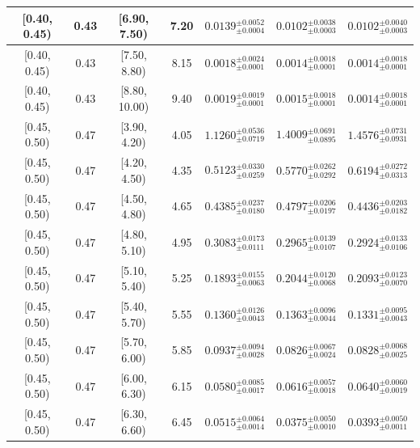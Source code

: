\begin{longtable}{|c|c|c|c|c|c|c|}
\hline
[0.40, 0.45) & 0.43 & [6.90, 7.50) & 7.20 & $0.0139^{ \pm 0.0052 }_{ \pm 0.0004 }$ & $0.0102^{ \pm 0.0038 }_{ \pm 0.0003 }$ & $0.0102^{ \pm 0.0040 }_{ \pm 0.0003 }$ \\ 
\hline
[0.40, 0.45) & 0.43 & [7.50, 8.80) & 8.15 & $0.0018^{ \pm 0.0024 }_{ \pm 0.0001 }$ & $0.0014^{ \pm 0.0018 }_{ \pm 0.0001 }$ & $0.0014^{ \pm 0.0018 }_{ \pm 0.0001 }$ \\ 
\hline
[0.40, 0.45) & 0.43 & [8.80, 10.00) & 9.40 & $0.0019^{ \pm 0.0019 }_{ \pm 0.0001 }$ & $0.0015^{ \pm 0.0018 }_{ \pm 0.0001 }$ & $0.0014^{ \pm 0.0018 }_{ \pm 0.0001 }$ \\ 
\hline
[0.45, 0.50) & 0.47 & [3.90, 4.20) & 4.05 & $1.1260^{ \pm 0.0536 }_{ \pm 0.0719 }$ & $1.4009^{ \pm 0.0691 }_{ \pm 0.0895 }$ & $1.4576^{ \pm 0.0731 }_{ \pm 0.0931 }$ \\ 
\hline
[0.45, 0.50) & 0.47 & [4.20, 4.50) & 4.35 & $0.5123^{ \pm 0.0330 }_{ \pm 0.0259 }$ & $0.5770^{ \pm 0.0262 }_{ \pm 0.0292 }$ & $0.6194^{ \pm 0.0272 }_{ \pm 0.0313 }$ \\ 
\hline
[0.45, 0.50) & 0.47 & [4.50, 4.80) & 4.65 & $0.4385^{ \pm 0.0237 }_{ \pm 0.0180 }$ & $0.4797^{ \pm 0.0206 }_{ \pm 0.0197 }$ & $0.4436^{ \pm 0.0203 }_{ \pm 0.0182 }$ \\ 
\hline
[0.45, 0.50) & 0.47 & [4.80, 5.10) & 4.95 & $0.3083^{ \pm 0.0173 }_{ \pm 0.0111 }$ & $0.2965^{ \pm 0.0139 }_{ \pm 0.0107 }$ & $0.2924^{ \pm 0.0133 }_{ \pm 0.0106 }$ \\ 
\hline
[0.45, 0.50) & 0.47 & [5.10, 5.40) & 5.25 & $0.1893^{ \pm 0.0155 }_{ \pm 0.0063 }$ & $0.2044^{ \pm 0.0120 }_{ \pm 0.0068 }$ & $0.2093^{ \pm 0.0123 }_{ \pm 0.0070 }$ \\ 
\hline
[0.45, 0.50) & 0.47 & [5.40, 5.70) & 5.55 & $0.1360^{ \pm 0.0126 }_{ \pm 0.0043 }$ & $0.1363^{ \pm 0.0096 }_{ \pm 0.0044 }$ & $0.1331^{ \pm 0.0095 }_{ \pm 0.0043 }$ \\ 
\hline
[0.45, 0.50) & 0.47 & [5.70, 6.00) & 5.85 & $0.0937^{ \pm 0.0094 }_{ \pm 0.0028 }$ & $0.0826^{ \pm 0.0067 }_{ \pm 0.0024 }$ & $0.0828^{ \pm 0.0068 }_{ \pm 0.0025 }$ \\ 
\hline
[0.45, 0.50) & 0.47 & [6.00, 6.30) & 6.15 & $0.0580^{ \pm 0.0085 }_{ \pm 0.0017 }$ & $0.0616^{ \pm 0.0057 }_{ \pm 0.0018 }$ & $0.0640^{ \pm 0.0060 }_{ \pm 0.0019 }$ \\ 
\hline
[0.45, 0.50) & 0.47 & [6.30, 6.60) & 6.45 & $0.0515^{ \pm 0.0064 }_{ \pm 0.0014 }$ & $0.0375^{ \pm 0.0050 }_{ \pm 0.0010 }$ & $0.0393^{ \pm 0.0050 }_{ \pm 0.0011 }$ \\ 
\hline

\end{longtable}
